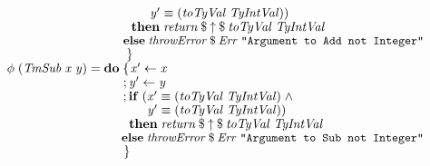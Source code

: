 \documentclass[10pt]{article}
\newcommand{\Conid}[1]{\mathit{#1}}
\newcommand{\Varid}[1]{\mathit{#1}}
\begin{document}
\begin{tabbing}
${\hskip1.00em\relax\hskip2.00em\relax\phantom{\Varid{\phi}\;(\Conid{TmAdd}\;\Varid{x}\;\Varid{y})\mathrel{=}\mathbf{do}\;\mbox{}}\phantom{;\mathbf{if}\;(\mbox{}}\Varid{y'}\equiv (\Varid{toTyVal}\;\Conid{TyIntVal}))}$\\
${\hskip1.00em\relax\hskip2.00em\relax\phantom{\Varid{\phi}\;(\Conid{TmAdd}\;\Varid{x}\;\Varid{y})\mathrel{=}\mathbf{do}\;\mbox{}}\phantom{;\mbox{}}\mathbf{then}\;\Varid{return}\mathbin{\$}\Varid{\uparrow}\mathbin{\$}\Varid{toTyVal}\;\Conid{TyIntVal}}$\\
${\hskip1.00em\relax\hskip2.00em\relax\phantom{\Varid{\phi}\;(\Conid{TmAdd}\;\Varid{x}\;\Varid{y})\mathrel{=}\mathbf{do}\;\mbox{}}\phantom{;\mbox{}}\mathbf{else}\;\Varid{throwError}\mathbin{\$}\Conid{Err}\;\text{\tt \char34 Argument~to~Add~not~Integer\char34}}$\\
${\hskip1.00em\relax\hskip2.00em\relax\phantom{\Varid{\phi}\;(\Conid{TmAdd}\;\Varid{x}\;\Varid{y})\mathrel{=}\mathbf{do}\;\mbox{}}\mskip1.5mu\}}$\\
${\hskip1.00em\relax\hskip2.00em\relax\Varid{\phi}\;(\Conid{TmSub}\;\Varid{x}\;\Varid{y})\mathrel{=}\mathbf{do}\;\{\mskip1.5mu \Varid{x'}\leftarrow \Varid{x}}$\\
${\hskip1.00em\relax\hskip2.00em\relax\phantom{\Varid{\phi}\;(\Conid{TmSub}\;\Varid{x}\;\Varid{y})\mathrel{=}\mathbf{do}\;\mbox{}};\Varid{y'}\leftarrow \Varid{y}}$\\
${\hskip1.00em\relax\hskip2.00em\relax\phantom{\Varid{\phi}\;(\Conid{TmSub}\;\Varid{x}\;\Varid{y})\mathrel{=}\mathbf{do}\;\mbox{}};\mathbf{if}\;(\Varid{x'}\equiv (\Varid{toTyVal}\;\Conid{TyIntVal})\mathrel{\wedge}}$\\
${\hskip1.00em\relax\hskip2.00em\relax\phantom{\Varid{\phi}\;(\Conid{TmSub}\;\Varid{x}\;\Varid{y})\mathrel{=}\mathbf{do}\;\mbox{}}\phantom{;\mathbf{if}\;(\mbox{}}\Varid{y'}\equiv (\Varid{toTyVal}\;\Conid{TyIntVal}))}$\\
${\hskip1.00em\relax\hskip2.00em\relax\phantom{\Varid{\phi}\;(\Conid{TmSub}\;\Varid{x}\;\Varid{y})\mathrel{=}\mathbf{do}\;\mbox{}}\phantom{;\mbox{}}\mathbf{then}\;\Varid{return}\mathbin{\$}\Varid{\uparrow}\mathbin{\$}\Varid{toTyVal}\;\Conid{TyIntVal}}$\\
${\hskip1.00em\relax\hskip2.00em\relax\phantom{\Varid{\phi}\;(\Conid{TmSub}\;\Varid{x}\;\Varid{y})\mathrel{=}\mathbf{do}\;\mbox{}}\phantom{;\mbox{}}\mathbf{else}\;\Varid{throwError}\mathbin{\$}\Conid{Err}\;\text{\tt \char34 Argument~to~Sub~not~Integer\char34}}$\\
${\hskip1.00em\relax\hskip2.00em\relax\phantom{\Varid{\phi}\;(\Conid{TmSub}\;\Varid{x}\;\Varid{y})\mathrel{=}\mathbf{do}\;\mbox{}}\mskip1.5mu\}}$\\

\end{tabbing}
\end{document}
